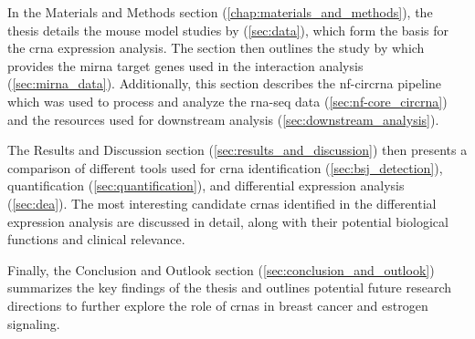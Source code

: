 In the Materials and Methods section (\cref{chap:materials_and_methods}), the
thesis details the mouse model studies by
\textcite{furth_esr1_2023,furth_overexpression_2023} (\cref{sec:data}), which
form the basis for the \gls{crna} expression analysis.
The section then outlines the study by \textcite{wang_characterization_2022}
which provides the \gls{mirna} target genes used in the interaction analysis
(\cref{sec:mirna_data}).
Additionally, this section describes the \gls{nf-circrna}
pipeline\supercite{digby_nf-corecircrna_2023} which was used to process and
analyze the \gls{rna-seq} data (\cref{sec:nf-core_circrna}) and the resources
used for downstream analysis (\cref{sec:downstream_analysis}).

The Results and Discussion section (\cref{sec:results_and_discussion}) then
presents a comparison of different tools used for \gls{crna} identification
(\cref{sec:bsj_detection}), quantification (\cref{sec:quantification}), and
differential expression analysis (\cref{sec:dea}).
The most interesting candidate \glspl{crna} identified in the differential
expression analysis are discussed in detail, along with their potential
biological functions and clinical relevance.

Finally, the Conclusion and Outlook section (\cref{sec:conclusion_and_outlook})
summarizes the key findings of the thesis and outlines potential future
research directions to further explore the role of \glspl{crna} in breast
cancer and estrogen signaling.
